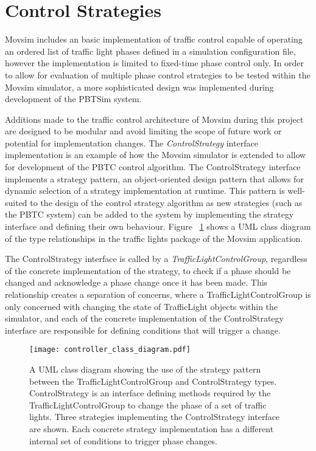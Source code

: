 
\section{Control Strategies}

Movsim includes an basic implementation of traffic control capable of operating an ordered list of traffic light phases defined in a simulation configuration file, however the implementation is limited to fixed-time phase control only. In order to allow for evaluation of multiple phase control strategies to be tested within the Movsim simulator, a more sophisticated design was implemented during development of the PBTSim system.

Additions made to the traffic control architecture of Movsim during this project are designed to be modular and avoid limiting the scope of future work or potential for implementation changes. The \emph{ControlStrategy} interface implementation is an example of how the Movsim simulator is extended to allow for development of the PBTC control algorithm. The ControlStrategy interface implements a strategy pattern, an object-oriented design pattern that allows for dynamic selection of a strategy implementation at runtime. This pattern is well-suited to the design of the control strategy algorithm as new strategies (such as the PBTC system) can be added to the system by implementing the strategy interface and defining their own behaviour. Figure ~\ref{controllerclassdiagram} shows a UML class diagram of the type relationships in the traffic lights package of the Movsim application.

The ControlStrategy interface is called by a \emph{TrafficLightControlGroup}, regardless of the concrete implementation of the strategy, to check if a phase should be changed and acknowledge a phase change once it has been made. This relationship creates a separation of concerns, where a TrafficLightControlGroup is only concerned with changing the state of TrafficLight objects within the simulator, and each of the concrete implementation of the ControlStrategy interface are responsible for defining conditions that will trigger a change. 

\begin{figure}[]
\centering
	\texttt{[image: controller\_class\_diagram.pdf]}
	\caption{ A UML class diagram showing the use of the strategy pattern between the TrafficLightControlGroup and ControlStrategy types. ControlStrategy is an interface defining methods required by the TrafficLightControlGroup to change the phase of a set of traffic lights. Three strategies implementing the ControlStrategy interface are shown. Each concrete strategy implementation has a different internal set of conditions to trigger phase changes. }
\label{controllerclassdiagram}
\end{figure}

